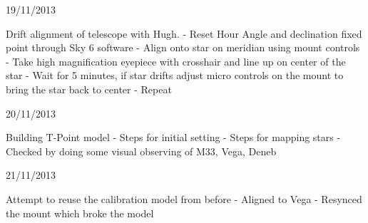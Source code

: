 19/11/2013

Drift alignment of telescope with Hugh.
 - Reset Hour Angle and declination fixed point through Sky 6 software
 - Align onto star on meridian using mount controls
 - Take high magnification eyepiece with crosshair and line up on center of the star
 - Wait for 5 minutes, if star drifts adjust micro controls on the mount to bring the star back to center
 - Repeat

 20/11/2013

 Building T-Point model
  - Steps for initial setting
  - Steps for mapping stars
  - Checked by doing some visual observing of M33, Vega, Deneb

21/11/2013

Attempt to reuse the calibration model from before
 - Aligned to Vega
 - Resynced the mount which broke the model